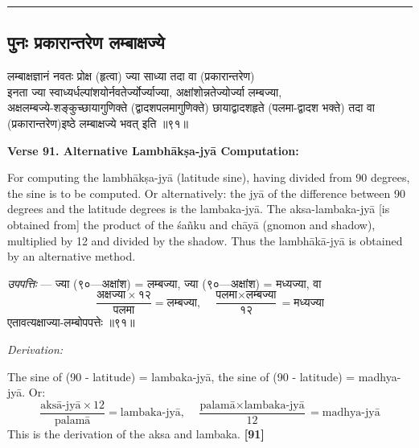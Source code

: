 \documentclass[11pt,a4paper]{article}
\newcommand{\longline}{\noindent\rule{\textwidth}{0.4pt}}
\newcommand{\dev}[1]{{\devanagarifont #1}}
\newcommand{\sectsep}{\par\vspace{0.8em}\longline\vspace{0.8em}}
\begin{document}
\sectsep

\subsection{\dev{पुनः प्रकारान्तरेण लम्बाक्षज्ये}}

\begin{minipage}[t]{0.48\textwidth}
\small\devanagarifont
लम्बाक्षज्ञानं नवतः प्रोक्ष (हृत्वा) ज्या साध्या तदा वा (प्रकारान्तरेण)\\
इनता ज्या स्वाध्यर्धल्पांशयोर्नवतेर्ज्योर्ज्याज्या, अक्षांशोन्नतेज्योर्ज्या लम्बज्या,\\
अक्षलम्बज्ये-शङ्कुच्छायागुणिक्ते (द्वादशपलमागुणिक्ते) छायाद्वादशहृते (पलमा-द्वादश भक्ते) तदा वा (प्रकारान्तरेण)इष्‍ठे लम्बाक्षज्ये भवत् इति ॥९१॥
\end{minipage}%
\hfill
\begin{minipage}[t]{0.48\textwidth}
\small
\textbf{Verse 91. Alternative Lambh\=ak\d{s}a-jy\=a Computation:}

For computing the lambh\=ak\d{s}a-jy\=a (latitude sine), having divided from 90 degrees, the sine is to be computed. Or alternatively: the jy\=a of the difference between 90 degrees and the latitude degrees is the lambaka-jy\=a. The aksa-lambaka-jy\=a [is obtained from] the product of the \'sa\~nku and ch\=ay\=a (gnomon and shadow), multiplied by 12 and divided by the shadow. Thus the lambh\=ak\=a-jy\=a is obtained by an alternative method.
\end{minipage}

\vspace{0.5em}
\begin{minipage}[t]{0.48\textwidth}
\small\devanagarifont
\textit{उपपत्तिः} --- ज्या (९०---अक्षांश) = लम्बज्या, ज्या (९०---अक्षांश) = मध्यज्या, वा
\[
\frac{\text{अक्षज्या} \times १२}{\text{पलमा}} = \text{लम्बज्या}, \quad \frac{\text{पलमा} \times \text{लम्बज्या}}{१२} = \text{मध्यज्या}
\]
एतावत्यक्षाज्या-लम्बोपपत्तेः ॥९१॥
\end{minipage}%
\hfill
\begin{minipage}[t]{0.48\textwidth}
\small
\textit{Derivation:}

The sine of (90 - latitude) = lambaka-jy\=a, the sine of (90 - latitude) = madhya-jy\=a. Or:
\[
\frac{\text{aks\=a-jy\=a} \times 12}{\text{palam\=a}} = \text{lambaka-jy\=a}, \quad \frac{\text{palam\=a} \times \text{lambaka-jy\=a}}{12} = \text{madhya-jy\=a}
\]
This is the derivation of the aksa and lambaka. \hfill\textbf{[91]}
\end{minipage}
\end{document}
